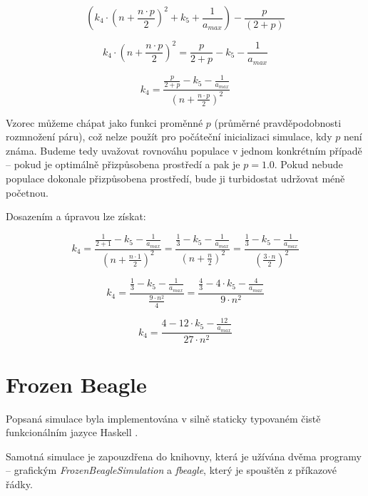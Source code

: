 \begin{equation}
(k_4\cdot{(n + \frac{n\cdot{}p}{2})^2} + {k_5} + \frac{1}{a_{max}}) - \frac{p}{(2 + p)}
\end{equation}

\begin{equation}
k_4\cdot{(n + \frac{n\cdot{}p}{2})^2} = \frac{p}{2 + p} -  {k_5} - \frac{1}{a_{max}}
\end{equation}

\begin{equation}
k_4  = \frac{\frac{p}{2 + p} -  {k_5} - \frac{1}{a_{max}}}{(n + \frac{n\cdot{}p}{2})^2}
\end{equation}


Vzorec můžeme chápat jako funkci proměnné $p$ (průměrné pravděpodobnosti rozmnožení páru), což nelze použít  pro
počáteční inicializaci simulace, kdy $p$ není známa. Budeme tedy uvažovat rovnováhu populace v jednom konkrétním
případě -- pokud je optimálně přizpůsobena prostředí a pak je $p = 1.0$. Pokud nebude populace dokonale přizpůsobena
prostředí, bude ji turbidostat udržovat méně početnou.

Dosazením a úpravou lze získat:



\begin{equation}
k_4  = \frac{\frac{1}{2 + 1} -  {k_5} - \frac{1}{a_{max}}}{(n + \frac{n\cdot{}1}{2})^2}
     = \frac{\frac{1}{3} -  {k_5} - \frac{1}{a_{max}}}{(n + \frac{n}{2})^2}
     = \frac{\frac{1}{3} -  {k_5} - \frac{1}{a_{max}}}{(\frac{3\cdot{}n}{2})^2}
\end{equation}

\begin{equation}
k_4  = \frac{\frac{1}{3} -  {k_5} - \frac{1}{a_{max}}}{\frac{9\cdot{}n^2}{4}}
     = \frac{\frac{4}{3} - 4\cdot{}{k_5} - \frac{4}{a_{max}}}{9\cdot{}n^2}
\end{equation}

\begin{equation}
k_4  = \frac{4 - 12\cdot{}{k_5} - \frac{12}{a_{max}}}{27\cdot{}n^2}
\end{equation}

\section{Frozen Beagle}

Popsaná simulace byla implementována v silně staticky typovaném čistě funkcionálním jazyce Haskell \citep{Haskell}.

Samotná simulace je zapouzdřena do knihovny, která je užívána dvěma programy -- grafickým
\textit{FrozenBeagleSimulation} a \textit{fbeagle}, který je spouštěn z příkazové řádky.

